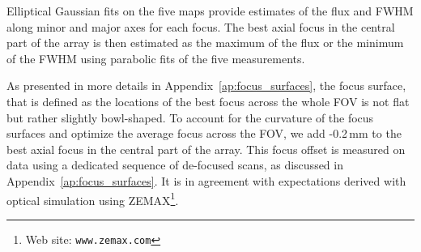 

Elliptical Gaussian fits on the five maps provide estimates of
the flux and FWHM along minor and major axes for each focus. 
The best axial focus in the central part of the array is then
estimated as the maximum of the flux or the minimum of the FWHM using
parabolic fits of the five measurements.

As presented in more details in Appendix~\ref{ap:focus_surfaces}, the focus
surface, that is defined as the locations of the best focus across the whole FOV
is not flat but rather slightly bowl-shaped.
To account for the curvature of the focus surfaces and optimize the
average focus across the FOV, we add -0.2\,mm to the best axial focus
in the central part of the array. This focus offset is measured on data using
a dedicated sequence of de-focused scans, as discussed in
Appendix~\ref{ap:focus_surfaces}. It is in agreement with expectations
derived with optical simulation using ZEMAX\footnote{Web site: \tt{www.zemax.com}}. 

